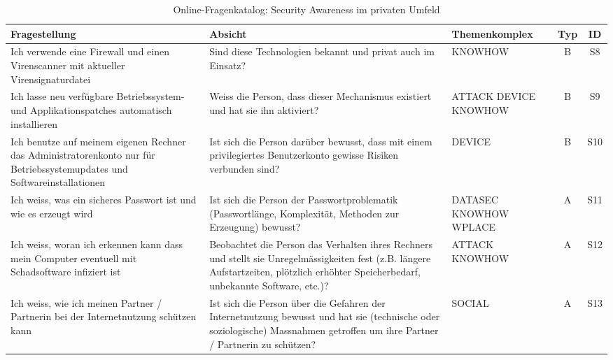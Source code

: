\documentclass[../../main.tex]{subfiles}
\begin{document}

\sloppy 

\begin{table}[H]
\tablefontsize	
\centering
\caption{Online-Fragenkatalog: Security Awareness im privaten Umfeld}
\label{Security Awareness im privaten Umfeld}
\begin{tabular}{ |p{5.5cm}|p{5.5cm}|p{2.5cm}|c|c|}

\hline
\tableheaderbgcolor
\textbf{Fragestellung} & \textbf{Absicht} & \textbf{Themenkomplex} & \textbf{Typ} & \textbf{ID}\\ 
\hline
Ich verwende eine Firewall und einen Virenscanner mit aktueller Virensignaturdatei &  Sind diese Technologien bekannt und privat auch im Einsatz? & KNOWHOW & B & S8 \\
\hline

Ich lasse neu verfügbare Betriebssystem- und Applikationspatches automatisch \newline installieren &  Weiss die Person, dass dieser Mechanismus existiert und hat sie ihn aktiviert? & ATTACK \newline DEVICE \newline KNOWHOW & B & S9 \\
\hline

Ich benutze auf meinem eigenen Rechner das Administratorenkonto nur für Betriebssystemupdates und Softwareinstallationen &  Ist sich die Person darüber bewusst, dass mit einem privilegiertes Benutzerkonto gewisse Risiken verbunden sind? & DEVICE & B & S10 \\
\hline

Ich weiss, was ein sicheres Passwort ist und wie es erzeugt wird &  Ist sich die Person der Passwortproblematik (Passwortlänge, Komplexität, Methoden zur Erzeugung) bewusst? & DATASEC \newline KNOWHOW \newline WPLACE & A & S11 \\
\hline

Ich weiss, woran ich erkennen kann dass mein Computer eventuell mit Schadsoftware infiziert ist &  Beobachtet die Person das Verhalten ihres Rechners und stellt sie Unregelmässigkeiten fest (z.B. längere Aufstartzeiten, plötzlich erhöhter Speicherbedarf, unbekannte Software, etc.)? & ATTACK \newline KNOWHOW & A & S12 \\
\hline

Ich weiss, wie ich meinen Partner / Partnerin bei der Internetnutzung schützen kann &  Ist sich die Person über die Gefahren der Internetnutzung bewusst und hat sie (technische oder soziologische) Massnahmen getroffen um ihre Partner / Partnerin zu schützen? & SOCIAL & A & S13 \\
\hline


\end{tabular}
\end{table}
\end{document}
